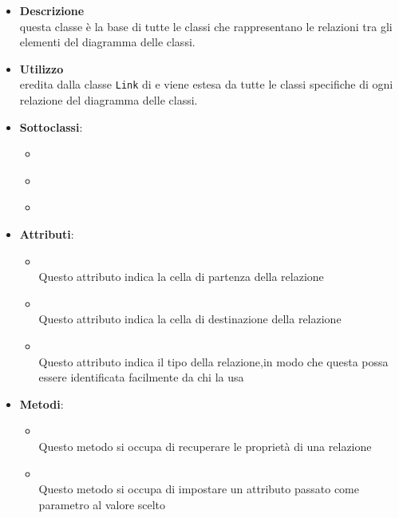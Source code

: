 \label{\nogloxy{swedesigner::client::model::celltypes::class::ClassDiagramLink}}
\begin{itemize}
\item \textbf{Descrizione}\\
questa classe è la base di tutte le classi che rappresentano le relazioni tra gli elementi del diagramma delle classi.
\item \textbf{Utilizzo}\\
eredita dalla classe \texttt{Link} di \jointjs{} e viene estesa da tutte le classi specifiche di ogni relazione del diagramma delle classi.
\item \textbf{Sottoclassi}:
\begin{itemize}
\item \hyperref[\nogloxy{swedesigner::client::model::celltypes::class::HxAssociation}]{}
\item \hyperref[\nogloxy{swedesigner::client::model::celltypes::class::HxGeneralization}]{}
\item \hyperref[\nogloxy{swedesigner::client::model::celltypes::class::HxImplementation}]{}
\end{itemize}
\item \textbf{Attributi}:
\begin{itemize}
\item {}
\\ Questo attributo indica la cella di partenza della relazione
\item {}
\\ Questo attributo indica la cella di destinazione della relazione
\item {}
\\ Questo attributo indica il tipo della relazione,in modo che questa possa essere identificata facilmente da chi la usa
\end{itemize}
\item \textbf{Metodi}:
\begin{itemize}
\item {}
\\ Questo metodo si occupa di recuperare le proprietà di una relazione
\item {}
\\ Questo metodo si occupa di impostare un attributo passato come parametro al valore scelto

\end{itemize}
\end{itemize}
